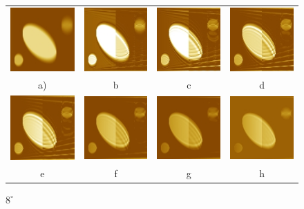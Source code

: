 \documentclass{procDDs}
\begin{document}
\begin{figure}[h!]\center
	\begin{tabular}{cccc}
		\includegraphics[width=0.2\linewidth]{img/9/1.jpg}
		&
		\includegraphics[width=0.2\linewidth]{img/9/3.jpg}
		&
		\includegraphics[width=0.2\linewidth]{img/9/4.jpg}
		&
		\includegraphics[width=0.2\linewidth]{img/9/5.jpg}
		\\
		a) & b & c & d
		\\
		\includegraphics[width=0.2\linewidth]{img/9/6.jpg}
		&
		\includegraphics[width=0.2\linewidth]{img/9/7.jpg}
		&
		\includegraphics[width=0.2\linewidth]{img/9/8.jpg}
		&
		\includegraphics[width=0.2\linewidth]{img/9/9.jpg}
		\\
		e & f & g & h
	\end{tabular}
	\caption{$8^\circ$}
	\label{ris:desc4}
\end{figure}
\end{document}
